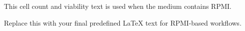 This cell count and viability text is used when the medium contains RPMI.

Replace this with your final predefined LaTeX text for RPMI-based workflows.

